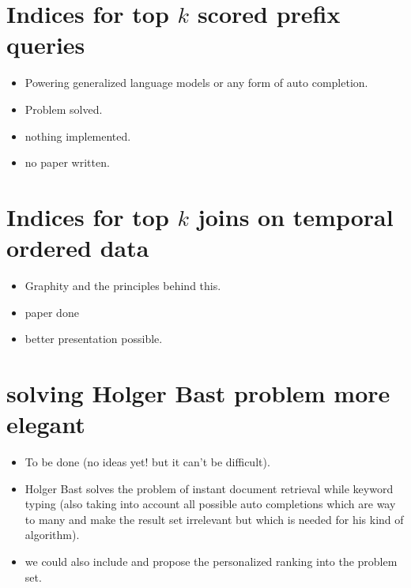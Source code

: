 \documentclass[•]{book}
\begin{document}
\chapter{Indices for top $k$ scored prefix queries}
\begin{itemize}
\item Powering generalized language models or any form of auto completion. 
\item Problem solved. 
\item nothing implemented.
\item no paper written.
\end{itemize}

\chapter{Indices for top $k$ joins on temporal ordered data}
\begin{itemize}
\item Graphity and the principles behind this. 
\item paper done 
\item better presentation possible. 
\end{itemize}
\chapter{solving Holger Bast problem more elegant}
\begin{itemize}
\item To be done (no ideas yet! but it can't be difficult).
\item Holger Bast solves the problem of instant document retrieval while keyword typing \cite{RW:Bast:2006} (also taking into account all possible auto completions which are way to many and make the result set irrelevant but which is needed for his kind of algorithm). 
\item we could also include and propose the personalized ranking into the problem set.
\end{itemize}
\end{document}
